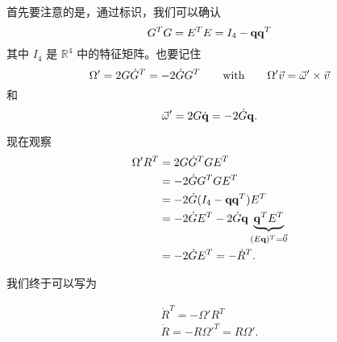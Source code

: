 首先要注意的是，通过标识，我们可以确认
\begin{equation}
G^T G = E^T E = I_4 - \mathbf q \mathbf q^T
\label{identity_in_R4}
\end{equation}
其中 $I_4$ 是 $\mathbb{R}^4$ 中的特征矩阵。也要记住 
\begin{equation*}
\Omega' = 2G\dot G^T = -2\dot G G^T \qquad \textrm{with} \qquad \Omega' \vec v = \vec{\omega}' \times \vec v
\end{equation*}
和
\begin{equation*}
\vec{\omega}' = 2G \dot{\mathbf q} = -2\dot G \mathbf q.
\end{equation*}

现在观察
\begin{align}
\Omega' R^T &= 2G\dot G^T G E^T \nonumber \\
                        &= -2\dot G G^T G E^T \nonumber \\
                        &=-2\dot G (I_4 -\mathbf q \mathbf q^T) E^T \nonumber \\
                        &=-2\dot G E^T -2\dot G \mathbf q \underbrace{\mathbf q^T E^T}_{(E\mathbf q)^T=\vec 0} \nonumber \\
                        &= -2\dot G E^T = -\dot R^T. \nonumber
\end{align}

我们终于可以写为 

\begin{gather}
\dot R^T   = -\Omega' R^T      \label{dotRt_with_Omega} \\
\dot R       = -R \Omega'^T = R \Omega'.
\label{dotR_with_Omega}
\end{gather}











%	
%		
%	
	
	


	





%
